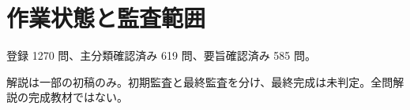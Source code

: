\chapter{作業状態と監査範囲}
登録 1270 問、主分類確認済み 619 問、要旨確認済み 585 問。
\par 解説は一部の初稿のみ。初期監査と最終監査を分け、最終完成は未判定。全問解説の完成教材ではない。
